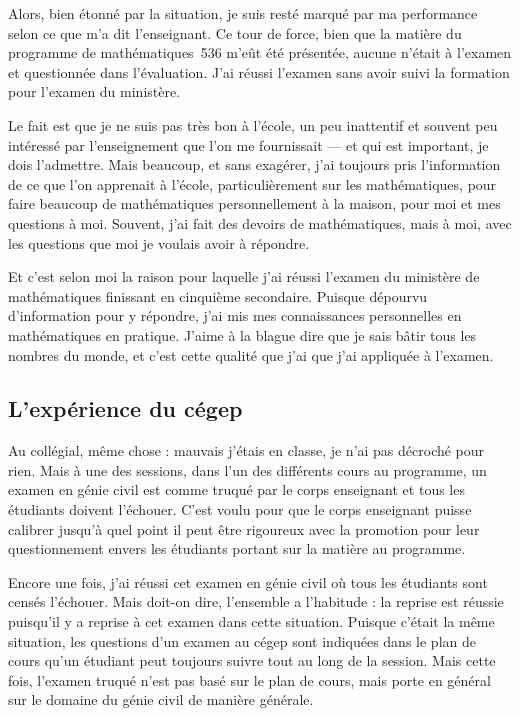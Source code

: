 \documentclass[12pt,oneside]{article}
\begin{document}
Alors, bien étonné par la situation, je suis resté marqué par ma performance selon ce que m'a dit l'enseignant. Ce tour de force, bien que la matière du programme de mathématiques~536 m'eût été présentée, aucune n'était à l'examen et questionnée dans l'évaluation. J'ai réussi l'examen sans avoir suivi la formation pour l'examen du ministère.

Le fait est que je ne suis pas très bon à l'école, un peu inattentif et souvent peu intéressé par l'enseignement que l'on me fournissait --- et qui est important, je dois l'admettre. Mais beaucoup, et sans exagérer, j'ai toujours pris l'information de ce que l'on apprenait à l'école, particulièrement sur les mathématiques, pour faire beaucoup de mathématiques personnellement à la maison, pour moi et mes questions à moi. Souvent, j'ai fait des devoirs de mathématiques, mais à moi, avec les questions que moi je voulais avoir à répondre.

Et c'est selon moi la raison pour laquelle j'ai réussi l'examen du ministère de mathématiques finissant en cinquième secondaire. Puisque dépourvu d'information pour y répondre, j'ai mis mes connaissances personnelles en mathématiques en pratique. J'aime à la blague dire que je sais bâtir tous les nombres du monde, et c'est cette qualité que j'ai que j'ai appliquée à l'examen.

\subsection{L'expérience du cégep}

Au collégial, même chose : mauvais j'étais en classe, je n'ai pas décroché pour rien. Mais à une des sessions, dans l'un des différents cours au programme, un examen en génie civil est comme truqué par le corps enseignant et tous les étudiants doivent l'échouer. C'est voulu pour que le corps enseignant puisse calibrer jusqu'à quel point il peut être rigoureux avec la promotion pour leur questionnement envers les étudiants portant sur la matière au programme.

Encore une fois, j'ai réussi cet examen en génie civil où tous les étudiants sont censés l'échouer. Mais doit-on dire, l'ensemble a l'habitude : la reprise est réussie puisqu'il y a reprise à cet examen dans cette situation. Puisque c'était la même situation, les questions d'un examen au cégep sont indiquées dans le plan de cours qu'un étudiant peut toujours suivre tout au long de la session. Mais cette fois, l'examen truqué n'est pas basé sur le plan de cours, mais porte en général sur le domaine du génie civil de manière générale.
\end{document}
